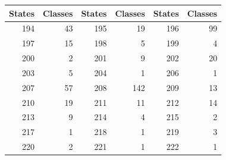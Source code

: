 \begin{center}\small\begin{tabular}{rrrrrr}
\toprule States & Classes & States & Classes & States & Classes\\\midrule
194 & 43 & 195 & 19 & 196 & 99\\
197 & 15 & 198 & 5 & 199 & 4\\
200 & 2 & 201 & 9 & 202 & 20\\
203 & 5 & 204 & 1 & 206 & 1\\
207 & 57 & 208 & 142 & 209 & 13\\
210 & 19 & 211 & 11 & 212 & 14\\
213 & 9 & 214 & 4 & 215 & 2\\
217 & 1 & 218 & 1 & 219 & 3\\
220 & 2 & 221 & 1 & 222 & 1\\
\bottomrule\end{tabular}\end{center}
